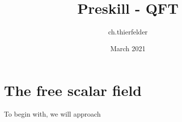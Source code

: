 \documentclass{article}
\title{Preskill - QFT}
\author{ch.thierfelder }
\date{March 2021}
\begin{document}
\maketitle

\section{The free scalar field}
To begin with, we will approach 
\end{document}
